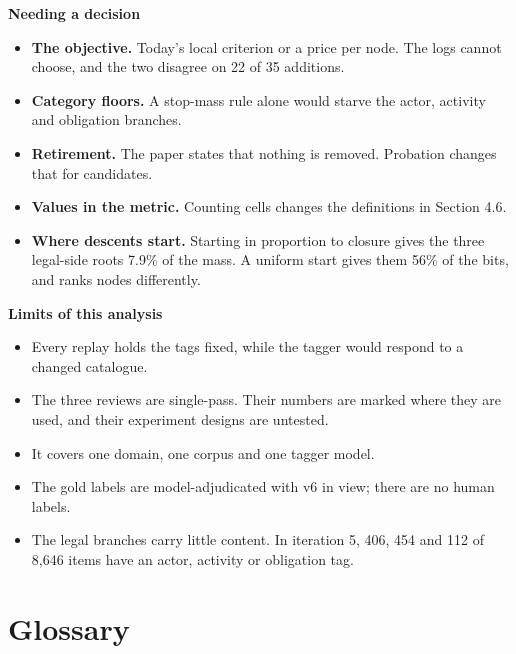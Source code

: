 \documentclass[10pt,a4paper]{article}
\newcommand{\lab}[1]{\par\vspace{0.35em}\textbf{#1}\par\nobreak}
\begin{document}
\lab{Needing a decision}
\begin{itemize}
\item \textbf{The objective.} Today's local criterion or a price per node. The logs cannot choose, and the two disagree on 22 of 35 additions.
\item \textbf{Category floors.} A stop-mass rule alone would starve the actor, activity and obligation branches.
\item \textbf{Retirement.} The paper states that nothing is removed. Probation changes that for candidates.
\item \textbf{Values in the metric.} Counting cells changes the definitions in Section 4.6.
\item \textbf{Where descents start.} Starting in proportion to closure gives the three legal-side roots 7.9\% of the mass. A uniform start gives them 56\% of the bits, and ranks nodes differently.
\end{itemize}

\lab{Limits of this analysis}
\begin{itemize}
\item Every replay holds the tags fixed, while the tagger would respond to a changed catalogue.
\item The three reviews are single-pass. Their numbers are marked where they are used, and their experiment designs are untested.
\item It covers one domain, one corpus and one tagger model.
\item The gold labels are model-adjudicated with v6 in view; there are no human labels.
\item The legal branches carry little content. In iteration 5, 406, 454 and 112 of 8,646 items have an actor, activity or obligation tag.
\end{itemize}

\appendix
\section{Glossary}
\end{document}
